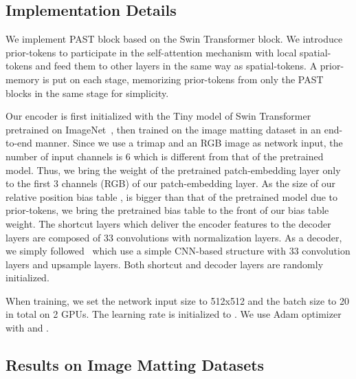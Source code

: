 \documentclass[10pt,twocolumn,letterpaper]{article}
\begin{document}
\subsection{Implementation Details}

We implement PAST block based on the Swin Transformer block. 
We introduce prior-tokens to participate in the self-attention mechanism with local spatial-tokens and feed them to other layers in the same way as spatial-tokens. A prior-memory is put on each stage, memorizing prior-tokens from only the PAST blocks in the same stage for simplicity.

Our encoder is first initialized with the Tiny model of Swin Transformer pretrained on ImageNet~\cite{deng2009imagenet}, then trained on the image matting dataset in an end-to-end manner.
Since we use a trimap and an RGB image as network input, the number of input channels is 6 which is different from that of the pretrained model.
Thus, we bring the weight of the pretrained patch-embedding layer only to the first 3 channels (RGB) of our patch-embedding layer.
As the size of our relative position bias table , is bigger than that of the pretrained model due to prior-tokens, we bring the pretrained bias table to the front of our bias table weight. 
The shortcut layers which deliver the encoder features to the decoder layers are composed of 33 convolutions with normalization layers. As a decoder, we simply followed~\cite{yu2021mask} which use a simple CNN-based structure with 33 convolution layers and upsample layers. Both shortcut and decoder layers are randomly initialized.

When training, we set the network input size to 512x512 and the batch size to 20 in total on 2 GPUs.
The learning rate is initialized to . We use Adam optimizer with  and .

\subsection{Results on Image Matting Datasets}
\end{document}

